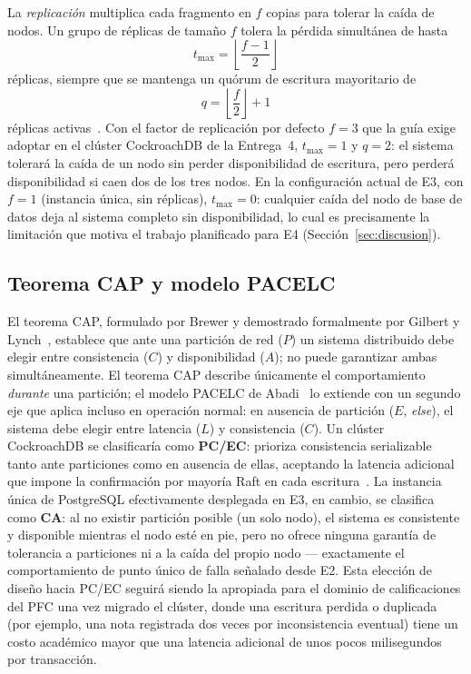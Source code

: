 \documentclass[12pt,a4paper]{article}
\begin{document}
La \emph{replicación} multiplica cada fragmento en $f$ copias para tolerar
la caída de nodos. Un grupo de réplicas de tamaño $f$ tolera la pérdida
simultánea de hasta
\begin{equation}
  t_{\max} = \left\lfloor \frac{f-1}{2} \right\rfloor
  \label{eq:tolerancia}
\end{equation}
réplicas, siempre que se mantenga un quórum de escritura mayoritario de
\begin{equation}
  q = \left\lfloor \frac{f}{2} \right\rfloor + 1
  \label{eq:quorum}
\end{equation}
réplicas activas~\cite{ongaro2014raft,taft2020cockroachdb}. Con el factor de
replicación por defecto $f=3$ que la guía exige adoptar en el clúster
CockroachDB de la Entrega~4, $t_{\max}=1$ y $q=2$: el sistema tolerará la
caída de un nodo sin perder disponibilidad de escritura, pero perderá
disponibilidad si caen dos de los tres nodos. En la configuración actual de
E3, con $f=1$ (instancia única, sin réplicas), $t_{\max}=0$: cualquier caída
del nodo de base de datos deja al sistema completo sin disponibilidad, lo
cual es precisamente la limitación que motiva el trabajo planificado para
E4 (Sección~\ref{sec:discusion}).

\subsection{Teorema CAP y modelo PACELC}
\label{sec:fundamento-cap}

El teorema CAP, formulado por Brewer y demostrado formalmente por Gilbert y
Lynch~\cite{gilbertlynch2002brewer}, establece que ante una partición de red
($P$) un sistema distribuido debe elegir entre consistencia ($C$) y
disponibilidad ($A$); no puede garantizar ambas simultáneamente. El teorema
CAP describe únicamente el comportamiento \emph{durante} una partición; el
modelo PACELC de Abadi~\cite{abadi2012consistency} lo extiende con un
segundo eje que aplica incluso en operación normal: en ausencia de
partición ($E$, \emph{else}), el sistema debe elegir entre latencia ($L$) y
consistencia ($C$). Un clúster CockroachDB se clasificaría como
\textbf{PC/EC}: prioriza consistencia serializable tanto ante particiones
como en ausencia de ellas, aceptando la latencia adicional que impone la
confirmación por mayoría Raft en cada escritura~\cite{taft2020cockroachdb}.
La instancia única de PostgreSQL efectivamente desplegada en E3, en cambio,
se clasifica como \textbf{CA}: al no existir partición posible (un solo
nodo), el sistema es consistente y disponible mientras el nodo esté en pie,
pero no ofrece ninguna garantía de tolerancia a particiones ni a la caída
del propio nodo --- exactamente el comportamiento de punto único de falla
señalado desde E2. Esta elección de diseño hacia PC/EC seguirá siendo la
apropiada para el dominio de calificaciones del PFC una vez migrado el
clúster, donde una escritura perdida o duplicada (por ejemplo, una nota
registrada dos veces por inconsistencia eventual) tiene un costo académico
mayor que una latencia adicional de unos pocos milisegundos por transacción.
\end{document}
